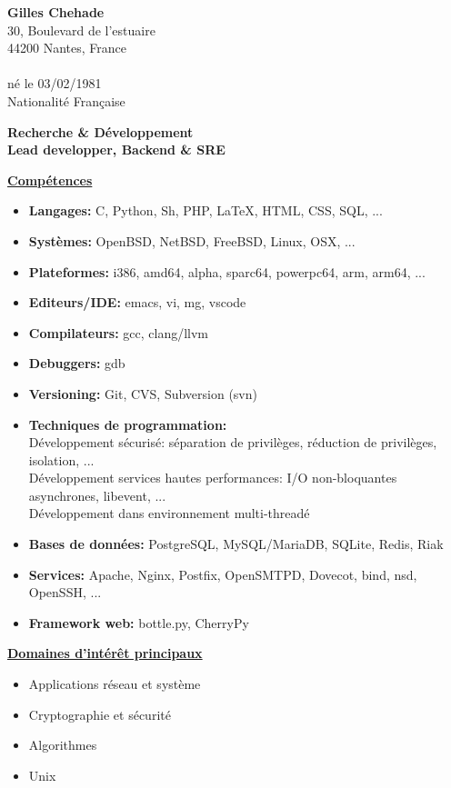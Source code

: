 \documentclass[a4paper,10pt]{letter}
\begin{document}
\textbf{Gilles Chehade}\\
30, Boulevard de l'estuaire\\
44200 Nantes, France\\
\\
n\'e le 03/02/1981\\
Nationalit\'e Fran\c caise\\

\begin{center}
  \large
  \textbf {
    Recherche \& D\'eveloppement\\
    Lead developper, Backend \& SRE\\
  }
\end{center}

\normalsize

\underline{\textbf{Comp\'etences}}\\
\begin{itemize}
\item	\textbf{Langages:}
  C, Python, Sh, PHP, \LaTeX, HTML, CSS, SQL, ...
\item	\textbf{Syst\`emes:}
  OpenBSD, NetBSD, FreeBSD, Linux, OSX, ...
\item	\textbf{Plateformes:}
  i386, amd64, alpha, sparc64, powerpc64, arm, arm64, ...
\item	\textbf{Editeurs/IDE:}
  emacs, vi, mg, vscode
\item	\textbf{Compilateurs:}
  gcc, clang/llvm
\item	\textbf{Debuggers:}
  gdb
\item	\textbf{Versioning:}
  Git, CVS, Subversion (svn)
\item	\textbf{Techniques de programmation:}\\
  D\'eveloppement s\'ecuris\'e: s\'eparation de
  privil\`eges, r\'eduction de privil\`eges, isolation, ...\\
  D\'eveloppement services hautes performances:
  I/O non-bloquantes asynchrones, libevent, ...\\
  D\'eveloppement dans environnement multi-thread\'e
\item	\textbf{Bases de donn\'ees:}
  PostgreSQL, MySQL/MariaDB, SQLite, Redis, Riak
\item	\textbf{Services:}
  Apache, Nginx, Postfix, OpenSMTPD, Dovecot, bind, nsd, OpenSSH, ...
\item	\textbf{Framework web:}
  bottle.py, CherryPy\\
\end{itemize}

\underline{\textbf{Domaines d'int\'er\^et principaux}}\\
\begin{itemize}
\item Applications r\'eseau et syst\`eme
\item Cryptographie et s\'ecurit\'e
\item Algorithmes
\item Unix\\
\end{itemize}
\end{document}
